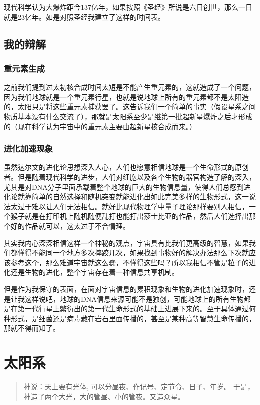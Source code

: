 \documentclass[11pt,oneside]{article}
\begin{document}
现代科学认为大爆炸距今137亿年，如果按照《圣经》所说是六日创世，那么一日就是23亿年。如是对照圣经我建立了这样的时间表。

\subsection{我的辩解}
\label{sec-3-2}
\subsubsection{重元素生成}
\label{sec-3-2-1}
之前我们提到过太初核合成时间太短是不能产生重元素的，这就造成了一个问题，因为我们地球就是一个重元素行星，也就是说地球上所有的重元素都不是太阳造的，太阳只是将这些重元素捕获罢了。这告诉我们一个简单的事实（假设星系之间物质基本没有什么交流了），那就是太阳系至少是继第一批超新星爆炸之后才形成的（现在科学认为宇宙中的重元素主要由超新星核合成而来。）

\subsubsection{进化加速现象}
\label{sec-3-2-2}
虽然达尔文的进化论思想深入人心，人们也愿意相信地球是一个生命形式的原创者。但是随着现代科学的进步，人们对细胞以及各个生物的器官构造了解的深入，尤其是对DNA分子里面承载着整个地球的巨大的生物信息量，使得人们总感到进化论就靠简单的自然选择和随机突变就能进化出如此完美多样的生物形式，这一说法太过于难以让人们无法相信。就好比现代物理学中量子理论那样要别人相信，一个猴子就是在打印机上随机随便乱打也能打出莎士比亚的作品，然后人们选择出那个好的作品就可以，这太过于不合情理。

其实我内心深深相信这样一个神秘的观点，宇宙具有比我们更高级的智慧，如果我们都懂得不能同一个地方多次摔跤几次，如果找到事物好的解决办法那么下次就应该参考这个，那么难道宇宙就这么蠢，不懂得这些吗？所以我相信不管是粒子的进化还是生物的进化，整个宇宙存在着一种信息共享机制。

但是作为我保守的表面，在面对宇宙信息的累积现象和生物的进化加速现象时，还是让我这样说吧，地球的DNA信息来源可能不是独创，可能地球上的所有生物都是在第一代行星上繁衍出的第一代生命形式的基础上进展下来的。至于具体通过何种形式，是细菌还是病毒藏在岩石里面传播的，甚至是某种高等智慧生命传播的，那就不得而知了。


\section{太阳系}
\label{sec-4}
\begin{quote}
神说：天上要有光体, 可以分昼夜、作记号、定节令、日子、年岁。
于是，神造了两个大光，大的管昼、小的管夜。又造众星。  
\end{quote}
\end{document}
